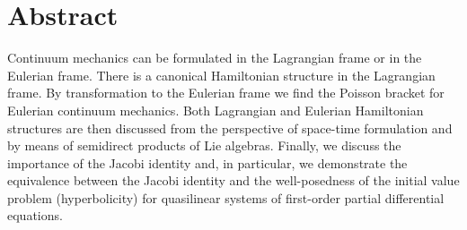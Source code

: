 \documentclass[
10pt, %
a4paper, %
oneside, %
headinclude,footinclude, %
BCOR5mm, %
]{scrartcl}
\title{\normalfont\spacedallcaps{On Hamiltonian continuum mechanics}} %
\author{\spacedlowsmallcaps{Michal Pavelka*\textsuperscript{1} \& Ilya Peshkov\textsuperscript{2} }} %
\date{} %
\begin{document}

\renewcommand{\sectionmark}[1]{\markright{\spacedlowsmallcaps{#1}}} %
\lehead{\mbox{\llap{\small\thepage\kern1em\color{halfgray} \vline}\color{halfgray}\hspace{0.5em}\rightmark\hfil}} %

\pagestyle{scrheadings} %


\maketitle %

\setcounter{tocdepth}{2} %

\tableofcontents %

\listoffigures %

\listoftables %


\section*{Abstract} %

Continuum mechanics can be formulated in the Lagrangian frame or in the Eulerian frame. There is a canonical Hamiltonian structure in the Lagrangian frame. By transformation to the Eulerian frame we find the Poisson bracket for Eulerian continuum mechanics. Both Lagrangian and Eulerian Hamiltonian structures are then discussed from the perspective of space-time formulation and by means of semidirect products of Lie algebras. Finally, we discuss the importance of the Jacobi identity and, in particular, we demonstrate the equivalence between the Jacobi identity and the well-posedness of the initial value problem (hyperbolicity) for quasilinear systems of first-order partial differential equations.
\end{document}
